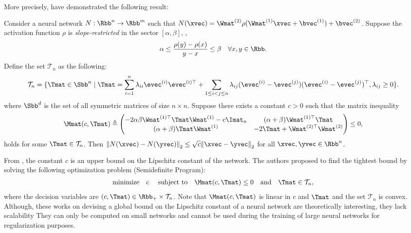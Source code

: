 More precisely, \citet{fazlyab2019efficient} have demonstrated the following result:
\begin{theorem} \label{theorem:ch3-lipschite_semidefinite_programming}
  Consider a neural network $N: \Rbb^n \rightarrow \Rbb^m$ such that $N(\xvec) = \Wmat^{(2)} \rho(\Wmat^{(1)} \xvec + \bvec^{(1)}) + \bvec^{(2)}$.
  Suppose the activation function $\rho$ is \emph{slope-restricted} in the sector $[\alpha,\beta]$, \ie,
  \begin{equation}
    \alpha \leq \frac{\rho(y) - \rho(x)}{y-x} \leq \beta \quad \forall x,y \in \Rbb. 
  \end{equation}
  Define the set $\mathcal{T}_{n}$ as the following:
  \begin{equation*}
    \mathcal{T}_n = \{\Tmat \in \Sbb^n \mid \Tmat = \sum_{i=1}^{n} \lambda_{ii} \evec^{(i)} \evec^{(i)\top} + \sum_{1 \leq i<j \leq n} \lambda_{ij}(\evec^{(i)} - \evec^{(j)})(\evec^{(i)}-\evec^{(j)})^\top, \lambda_{ij} \geq 0 \}.
  \end{equation*}
  where $\Sbb^d$ is the set of all symmetric matrices of size $n \times n$.
  Suppose there exists a constant $c>0$ such that the matrix inequality
  \begin{align}
    \Mmat(c,\Tmat) \triangleq
      \leftmatrix
      -2\alpha \beta \Wmat^{(1)\top} \Tmat \Wmat^{(1)} - c \Imat_n & (\alpha+\beta) \Wmat^{(1)\top} \Tmat  \\
      (\alpha+\beta) \Tmat \Wmat^{(1)} & -2\Tmat+\Wmat^{(2)\top} \Wmat^{(2)}
      \rightmatrix
      \leq 0,
  \end{align}
  holds for some $\Tmat \in \mathcal{T}_{n}$. Then $\norm{N(\xvec)-N(\yvec)}_2 \leq \sqrt{c} \norm{\xvec-\yvec}_2$ for all  $\xvec,\yvec \in \Rbb^n$.
\end{theorem}
\noindent
From , the constant $c$ is an upper bound on the Lipschitz constant of the network.
The authors proposed to find the tightest bound by solving the following optimization problem (Semidefinite Program):
\begin{align}
  \textrm{minimize} \quad c \quad \text{ subject to} \quad \Mmat(c,\Tmat) \leq 0 \quad \text{and} \quad \Tmat \in \mathcal{T}_{n},
\end{align}
where the decision variables are $(c,\Tmat) \in \Rbb_+ \times \mathcal{T}_n$.
Note that $\Mmat(c,\Tmat)$ is linear in $c$ and $\Tmat$ and the set $\mathcal{T}_n$ is convex.
Although, these works on devising a global bound on the Lipschitz constant of a neural network are theoretically interesting, they lack scalability
They can only be computed on small networks and cannot be used during the training of large neural networks for regularization purposes.


